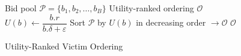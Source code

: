 
\begin{figure}[t]
\begin{algorithm}[H]
\caption{Utility-Ranked Victim Ordering}\label{alg:greedy}
\begin{algorithmic}[1]
\Require Bid pool $\mathcal{P} = \{b_1, b_2, \ldots, b_B\}$
\Ensure Utility-ranked ordering $\mathcal{O}$
  \State $U(b) \gets \dfrac{b.r}{b.\delta + \varepsilon}$
\EndFor
\State Sort $\mathcal{P}$ by $U(b)$ in decreasing order $\to \mathcal{O}$
\State \Return $\mathcal{O}$
\end{algorithmic}
\end{algorithm}
\vspace{-0.4em}
\end{figure}
